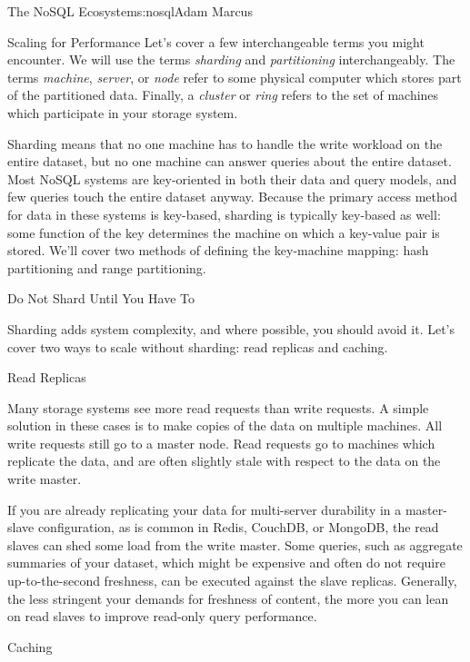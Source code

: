 \begin{aosachapter}{The NoSQL Ecosystem}{s:nosql}{Adam Marcus}
\begin{aosasect1}{Scaling for Performance}
Let's cover a few interchangeable terms you might encounter.  We will
use the terms \emph{sharding} and \emph{partitioning} interchangeably.
The terms \emph{machine}, \emph{server}, or \emph{node} refer to some
physical computer which stores part of the partitioned data.  Finally,
a \emph{cluster} or \emph{ring} refers to the set of machines which
participate in your storage system.

Sharding means that no one machine has to handle the write workload on
the entire dataset, but no one machine can answer queries about the
entire dataset.  Most NoSQL systems are key-oriented in both their
data and query models, and few queries touch the entire dataset
anyway.  Because the primary access method for data in these systems
is key-based, sharding is typically key-based as well: some function
of the key determines the machine on which a key-value pair is
stored.  We'll cover two methods of defining the key-machine mapping:
hash partitioning and range partitioning.

\begin{aosasect2}{Do Not Shard Until You Have To}

Sharding adds system complexity, and where possible, you should avoid
it.  Let's cover two ways to scale without sharding: read replicas and
caching.

\begin{aosasect3}{Read Replicas}

Many storage systems see more read requests than write requests.  A
simple solution in these cases is to make copies of the data on
multiple machines.  All write requests still go to a master node.
Read requests go to machines which replicate the data, and are often
slightly stale with respect to the data on the write master.

If you are already replicating your data for multi-server durability
in a master-slave configuration, as is common in Redis, CouchDB, or
MongoDB, the read slaves can shed some load from the write master.
Some queries, such as aggregate summaries of your dataset, which might
be expensive and often do not require up-to-the-second freshness, can
be executed against the slave replicas.  Generally, the less stringent
your demands for freshness of content, the more you can lean on read
slaves to improve read-only query performance.

\end{aosasect3}

\begin{aosasect3}{Caching}


\end{aosasect3}
\end{aosasect2}
\end{aosasect1}
\end{aosachapter}
